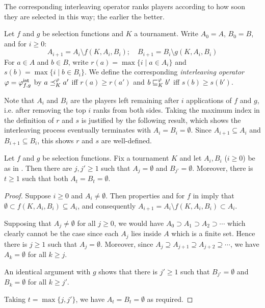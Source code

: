 The corresponding interleaving operator ranks players according to how soon
they are selected in this way; the earlier the better.

\begin{definition}%
    \label{tourn_def_interleaving}

    Let $f$ and $g$ be selection functions and $K$ a tournament. Write $A_0
    = A$, $B_0 = B$, and for $i \ge 0$:
    \[
        A_{i+1} = A_i \setminus f(K, A_i, B_i);
        \quad
        B_{i+1} = B_i \setminus g(K, A_i, B_i)
    \]
    For $a \in A$ and $b \in B$, write $r(a) = \max{\{ i \mid a \in A_i \}}$
    and $s(b) = \max{\{ i \mid b \in B_i \}}$. We define the
    corresponding \emph{interleaving operator} $\varphi = {\varphi_{f,g}^\mathsf{int}}$ by $a
    \preceq_K^\varphi a'$ iff $r(a) \ge r(a')$ and $b \sqsubseteq_K^\varphi b'$ iff $s(b) \ge
    s(b')$.

\end{definition}

Note that $A_i$ and $B_i$ are the players left remaining after $i$ applications
of $f$ and $g$, i.e. after removing the top $i$ ranks from both sides. Taking
the maximum index in the definition of $r$ and $s$ is justified by the
following result, which shows the interleaving process eventually terminates
with $A_i = B_i = \emptyset$. Since $A_{i + 1} \subseteq A_i$ and $B_{i + 1}
\subseteq B_i$, this shows $r$ and $s$ are well-defined.

\begin{proposition}
    \label{tourn_prop_interleaving_terminates}

    Let $f$ and $g$ be selection functions. Fix a tournament $K$ and let $A_i,
    B_i$ ($i \ge 0$) be as in . Then there are $j, j'
    \ge 1$ such that $A_j = \emptyset$ and $B_{j'} = \emptyset$. Moreover,
    there is $t \ge 1$ such that both $A_t = B_t = \emptyset$.

\end{proposition}

\begin{proof}

    Suppose $i \ge 0$ and $A_i \ne \emptyset$. Then properties
     and  for $f$ in
     imply that $\emptyset \subset f(K, A_i, B_i)
    \subseteq A_i$, and consequently $A_{i+1} = A_i \setminus f(K, A_i, B_i)
    \subset A_i$.

    Supposing that $A_j \ne \emptyset$ for all $j \ge 0$, we would have $A_0
    \supset A_1 \supset A_2 \supset \cdots$ which clearly cannot be the case
    since each $A_j$ lies inside $A$ which is a finite set. Hence there is $j
    \ge 1$ such that $A_j = \emptyset$. Moreover, since $A_j \supseteq A_{j+1}
    \supseteq A_{j+2} \supseteq \cdots$, we have $A_k = \emptyset$ for all $k
    \ge j$.

    An identical argument with $g$ shows that there is $j' \ge 1$ such that
    $B_{j'} = \emptyset$ and $B_k = \emptyset$ for all $k \ge j'$.

    Taking $t = \max\{j, j'\}$, we have $A_t = B_t = \emptyset$ as required.
\end{proof}

